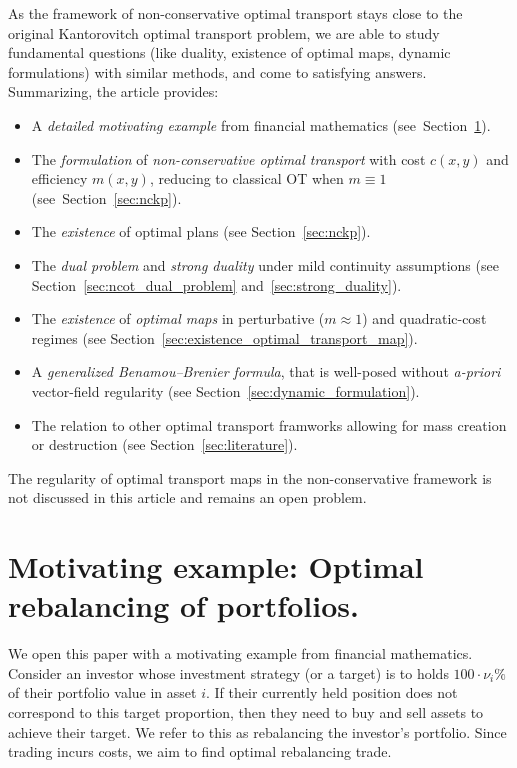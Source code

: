 \documentclass{article}
\theoremstyle{definition}
\begin{document}
As the framework of non-conservative optimal transport stays close to the original Kantorovitch optimal transport problem, we are able to  study fundamental questions (like duality, existence of optimal maps, dynamic formulations) with similar methods, and come to satisfying answers. Summarizing, the article provides:
    \begin{itemize}
     \item A \emph{detailed motivating example} from financial mathematics (see~Section~\ref{sec:rebalancing_general_graphs}).
      \item The \emph{formulation} of \emph{non-conservative optimal transport} with cost \(c(x,y)\) and efficiency \(m(x,y)\), reducing to classical OT when \(m\equiv 1\) (see~Section~\ref{sec:nckp}).  
      \item The \emph{existence} of optimal plans (see Section~\ref{sec:nckp}).
      \item The \emph{dual problem} and \emph{strong duality} under mild continuity assumptions (see Section~\ref{sec:ncot_dual_problem} and~\ref{sec:strong_duality}).  
      \item The \emph{existence} of \emph{optimal maps} in perturbative (\(m \approx 1\)) and quadratic-cost regimes (see Section~\ref{sec:existence_optimal_transport_map}).
      \item A \emph{generalized Benamou--Brenier formula}, that is well-posed without \emph{a-priori} vector-field regularity (see Section~\ref{sec:dynamic_formulation}).  
      \item The relation to other optimal transport framworks allowing for mass creation or destruction (see Section~\ref{sec:literature}).  
    \end{itemize}
The regularity of optimal transport maps in the non-conservative framework is not discussed in this article and remains an open problem.









\section{Motivating example: Optimal rebalancing of portfolios.} \label{sec:rebalancing_general_graphs}
We open this paper with a motivating example from financial mathematics. Consider an investor whose investment strategy (or a target) is to holds $100 \cdot \nu_i \%$ of their portfolio value in asset $i$. If their currently held position does not correspond to this target proportion, then they need to buy and sell assets to achieve their target. We refer to this as rebalancing the investor's portfolio. Since trading incurs costs, we aim to find optimal rebalancing trade.\\
\end{document}
